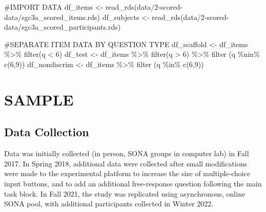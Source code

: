\documentclass[
  letterpaper,
  DIV=11,
  numbers=noendperiod]{scrreprt}
\newenvironment{Shaded}{\begin{snugshade}}{\end{snugshade}}
\newcommand{\CommentTok}[1]{\textcolor[rgb]{0.37,0.37,0.37}{#1}}
\newcommand{\DecValTok}[1]{\textcolor[rgb]{0.68,0.00,0.00}{#1}}
\newcommand{\FunctionTok}[1]{\textcolor[rgb]{0.28,0.35,0.67}{#1}}
\newcommand{\NormalTok}[1]{\textcolor[rgb]{0.00,0.23,0.31}{#1}}
\newcommand{\OtherTok}[1]{\textcolor[rgb]{0.00,0.23,0.31}{#1}}
\newcommand{\SpecialCharTok}[1]{\textcolor[rgb]{0.37,0.37,0.37}{#1}}
\newcommand{\StringTok}[1]{\textcolor[rgb]{0.13,0.47,0.30}{#1}}
\begin{document}
\begin{Shaded}
\begin{Highlighting}[]
\CommentTok{\#IMPORT DATA }
\NormalTok{df\_items }\OtherTok{\textless{}{-}} \FunctionTok{read\_rds}\NormalTok{(}\StringTok{\textquotesingle{}data/2{-}scored{-}data/sgc3a\_scored\_items.rds\textquotesingle{}}\NormalTok{)}
\NormalTok{df\_subjects }\OtherTok{\textless{}{-}} \FunctionTok{read\_rds}\NormalTok{(}\StringTok{\textquotesingle{}data/2{-}scored{-}data/sgc3a\_scored\_participants.rds\textquotesingle{}}\NormalTok{) }

\CommentTok{\#SEPARATE ITEM DATA BY QUESTION TYPE}
\NormalTok{df\_scaffold }\OtherTok{\textless{}{-}}\NormalTok{ df\_items }\SpecialCharTok{\%\textgreater{}\%} \FunctionTok{filter}\NormalTok{(q }\SpecialCharTok{\textless{}} \DecValTok{6}\NormalTok{)}
\NormalTok{df\_test }\OtherTok{\textless{}{-}}\NormalTok{ df\_items }\SpecialCharTok{\%\textgreater{}\%} \FunctionTok{filter}\NormalTok{(q }\SpecialCharTok{\textgreater{}} \DecValTok{6}\NormalTok{) }\SpecialCharTok{\%\textgreater{}\%} \FunctionTok{filter}\NormalTok{ (q }\SpecialCharTok{\%nin\%} \FunctionTok{c}\NormalTok{(}\DecValTok{6}\NormalTok{,}\DecValTok{9}\NormalTok{))}
\NormalTok{df\_nondiscrim }\OtherTok{\textless{}{-}}\NormalTok{ df\_items }\SpecialCharTok{\%\textgreater{}\%} \FunctionTok{filter}\NormalTok{ (q }\SpecialCharTok{\%in\%} \FunctionTok{c}\NormalTok{(}\DecValTok{6}\NormalTok{,}\DecValTok{9}\NormalTok{))}
\end{Highlighting}
\end{Shaded}

\hypertarget{sample-1}{%
\section{SAMPLE}\label{sample-1}}

\hypertarget{data-collection}{%
\subsection{Data Collection}\label{data-collection}}

Data was initially collected (in person, SONA groups in computer lab) in
Fall 2017. In Spring 2018, additional data were collected after small
modifications were made to the experimental platform to increase the
size of multiple-choice input buttons, and to add an additional
free-response question following the main task block. In Fall 2021, the
study was replicated using asynchronous, online SONA pool, with
additional participants collected in Winter 2022.
\end{document}
